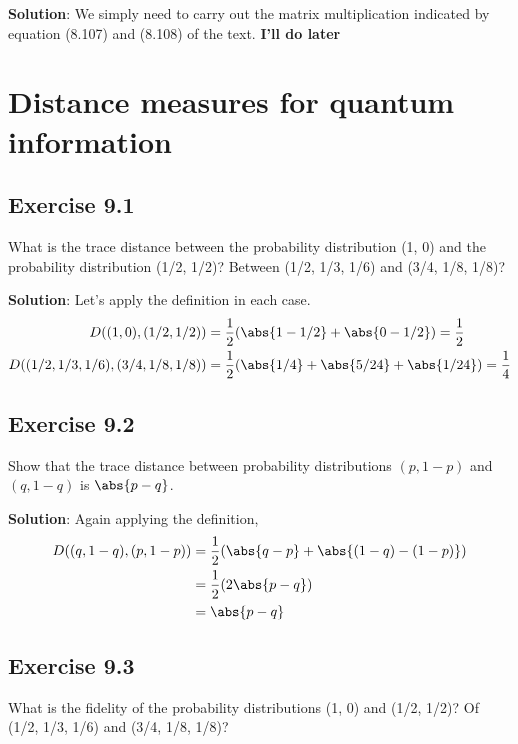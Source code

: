 \documentclass{book}
\begin{document}
    \textbf{Solution}: We simply need to carry out the matrix multiplication indicated by equation (8.107) and (8.108) of the text. \textbf{I'll do later}

\chapter{Distance measures for quantum information}

\section*{Exercise 9.1}
    What is the trace distance between the probability distribution (1, 0) and the probability distribution (1/2, 1/2)? Between (1/2, 1/3, 1/6) and (3/4, 1/8, 1/8)?
    
    \textbf{Solution}: Let's apply the definition in each case.
    \begin{align}
    \begin{aligned}
        D((1,0), (1/2,1/2)) &= \frac{1}{2} (\abs{1-1/2}+\abs{0-1/2}) = \frac{1}{2}\\
        D((1/2,1/3,1/6), (3/4,1/8,1/8)) &= \frac{1}{2} (\abs{1/4} + \abs{5/24}+\abs{1/24}) = \frac{1}{4}
    \end{aligned}
    \end{align}
    
\section*{Exercise 9.2}
    Show that the trace distance between probability distributions $(p, 1 - p)$ and $(q, 1 - q)$ is $\abs{p - q}$.
    
    \textbf{Solution}: Again applying the definition,
    \begin{align}
    \begin{aligned}
        D((q,1-q), (p,1-p)) &= \frac{1}{2}(\abs{q-p} + \abs{(1-q)-(1-p)}) \\
        &= \frac{1}{2} (2 \abs{p-q}) \\
        &= \abs{p-q}
    \end{aligned}
    \end{align}

\section*{Exercise 9.3}
    What is the fidelity of the probability distributions (1, 0) and (1/2, 1/2)? Of (1/2, 1/3, 1/6) and (3/4, 1/8, 1/8)?
    
\end{document}
